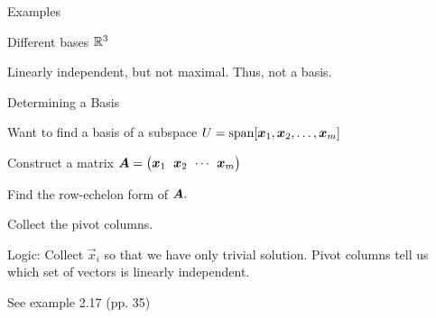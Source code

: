 \documentclass[handout,fleqn,aspectratio=169]{beamer}
\begin{document}
\begin{frame}{Examples}

\plitemsep 0.1in

\bci 
\item Different bases ${\mathbb R}^3$
\item Linearly independent, but not maximal. Thus, not a basis. 

\eci

\end{frame}


\begin{frame}{Determining a Basis}

\plitemsep 0.1in

\bci 
\item Want to find a basis of a subspace $U = \text{span}[\bm{x}_1, \bm{x}_2, \ldots, \bm{x}_m]$

\bce
\item Construct a matrix $\mat{A} = \rowvec{\vec{x}_1 & \vec{x}_2 & \cdots & \vec{x}_m}$
\item Find the row-echelon form of $\bm{A}.$
\item Collect the pivot columns.
\ece

\item Logic: Collect $\vec{x}_i$ so that we have only trivial solution. Pivot columns tell us which set of vectors is linearly independent. 

\item See example 2.17 (pp. 35)
\eci

\end{frame}
\end{document}
